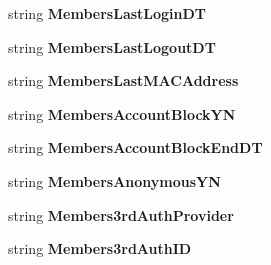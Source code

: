 \begin{DoxyCompactItemize}
\item 
string {\bfseries Members\+Last\+Login\+DT}\hypertarget{a00115_a75d7ec8e7d4b6e48d095d115c39be4a6}{}\label{a00115_a75d7ec8e7d4b6e48d095d115c39be4a6}

\item 
string {\bfseries Members\+Last\+Logout\+DT}\hypertarget{a00115_ae9c765320dbb94d7ea852189b6fa0a75}{}\label{a00115_ae9c765320dbb94d7ea852189b6fa0a75}

\item 
string {\bfseries Members\+Last\+M\+A\+C\+Address}\hypertarget{a00115_abeb0c304bafc169290be0b635fd46538}{}\label{a00115_abeb0c304bafc169290be0b635fd46538}

\item 
string {\bfseries Members\+Account\+Block\+YN}\hypertarget{a00115_abf12e094bfa8826a6319d7d8cb4f9d06}{}\label{a00115_abf12e094bfa8826a6319d7d8cb4f9d06}

\item 
string {\bfseries Members\+Account\+Block\+End\+DT}\hypertarget{a00115_a51463090057d83899bf7f74401ed932b}{}\label{a00115_a51463090057d83899bf7f74401ed932b}

\item 
string {\bfseries Members\+Anonymous\+YN}\hypertarget{a00115_a67c57ab4fc47b206614643b1cae6bbcf}{}\label{a00115_a67c57ab4fc47b206614643b1cae6bbcf}

\item 
string {\bfseries Members3rd\+Auth\+Provider}\hypertarget{a00115_a36874ab2eeaa35bd75be941ed34ac0c0}{}\label{a00115_a36874ab2eeaa35bd75be941ed34ac0c0}

\item 
string {\bfseries Members3rd\+Auth\+ID}\hypertarget{a00115_a97806fcfbdbf11705db85be1ff3d393c}{}\label{a00115_a97806fcfbdbf11705db85be1ff3d393c}


\end{DoxyCompactItemize}
